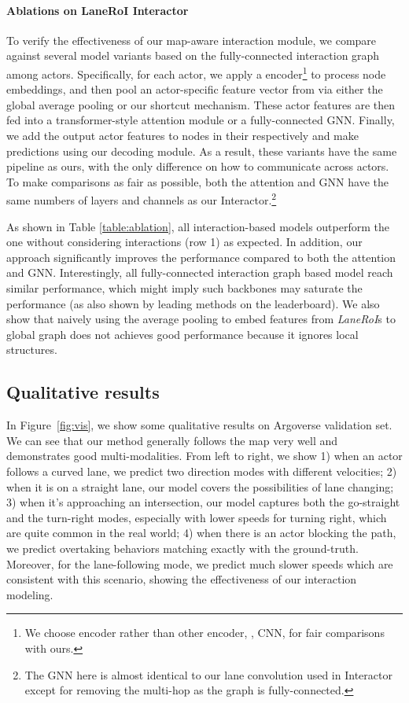 \paragraph{Ablations on LaneRoI Interactor}
To verify the effectiveness of our map-aware interaction module, we compare against several model variants based
on the fully-connected interaction graph among actors. Specifically, for each actor,
we apply a \ROI encoder\footnote{We choose \ROI encoder rather than other
encoder, \eg, CNN, for fair comparisons with ours.} to process node embeddings, and then pool an
actor-specific feature vector from \ROI via either the global average pooling or our
shortcut mechanism. These actor features are then fed into a transformer-style
\cite{transformer} attention module or a fully-connected GNN.
Finally, we add the output actor features to nodes in their \ROI respectively
and make predictions using our decoding module.
As a result, these variants have the same pipeline as ours, with the only
difference on how to communicate across actors. To make comparisons
as fair as possible, both the attention and GNN have the same
numbers of layers and channels as our \ROI Interactor.\footnote{The GNN here is almost identical to our lane
convolution used in Interactor except for removing the multi-hop as the graph is fully-connected.}

As shown in Table \ref{table:ablation}, all interaction-based models outperform
the one without considering interactions (row 1) as expected. In addition, our
approach significantly improves the performance compared to both the attention and GNN. 
Interestingly, all fully-connected interaction graph based model reach similar
performance, which might imply such backbones may saturate the performance (as
also shown by leading methods on the leaderboard).
We also show that naively using the average pooling to embed features from
\textit{LaneRoI}s to global graph does not achieves good performance
because it ignores local structures.

\subsection{Qualitative results}
In Figure~\ref{fig:vis}, we show some qualitative results on Argoverse validation
set. We can see that our method generally follows the map very well and demonstrates good
multi-modalities. From left to right, we show 1) when an actor follows a
curved lane, we predict two direction modes with different velocities;
2) when it is on a straight lane, our model covers the possibilities of lane changing; 3)
when it's approaching an intersection, our model captures both the go-straight and the
turn-right modes, especially with lower speeds for turning right, which are
quite common in the real world; 4) when there is an actor blocking the path, we
predict overtaking behaviors matching exactly with the ground-truth. Moreover,
for the lane-following mode, we predict much slower speeds which are consistent with
this scenario, showing the effectiveness of our interaction modeling. 

